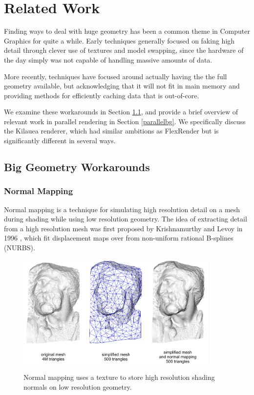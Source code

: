 \documentclass[12pt]{ucthesis}
\newcommand{\captionfonts}{\small\bf\ssp}
\begin{document}
\chapter{Related Work}
\label{relatedwork}

Finding ways to deal with huge geometry has been a common theme in Computer
Graphics for quite a while. Early techniques generally focused on faking
high detail through clever use of textures and model swapping, since the
hardware of the day simply was not capable of handling massive amounts of data.

More recently, techniques have focused around actually having the the full
geometry available, but acknowledging that it will not fit in main memory and
providing methods for efficiently caching data that is out-of-core.

We examine these workarounds in Section \ref{workarounds}, and provide a brief
overview of relevant work in parallel rendering in Section \ref{parallelbg}.
We specifically discuss the Kilauea renderer, which had similar ambitions as
FlexRender but is significantly different in several ways.

\section{Big Geometry Workarounds}
\label{workarounds}

\subsection{Normal Mapping}
\label{normalmaps}

Normal mapping is a technique for simulating high resolution detail on a mesh
during shading while using low resolution geometry. The idea of extracting
detail from a high resolution mesh was first proposed by Krishnamurthy and
Levoy in 1996 \cite{krishnamurthy:1996}, which fit displacement maps over
from non-uniform rational B-splines (NURBS).

\begin{figure}[h!]
    \centering
    \includegraphics[width=100mm]{images/normalmapping.png}
    \captionfonts
    \caption{Normal mapping uses a texture to store high resolution shading normals on low resolution geometry.}
    \label{fig:normalmapping}
\end{figure}
\end{document}
